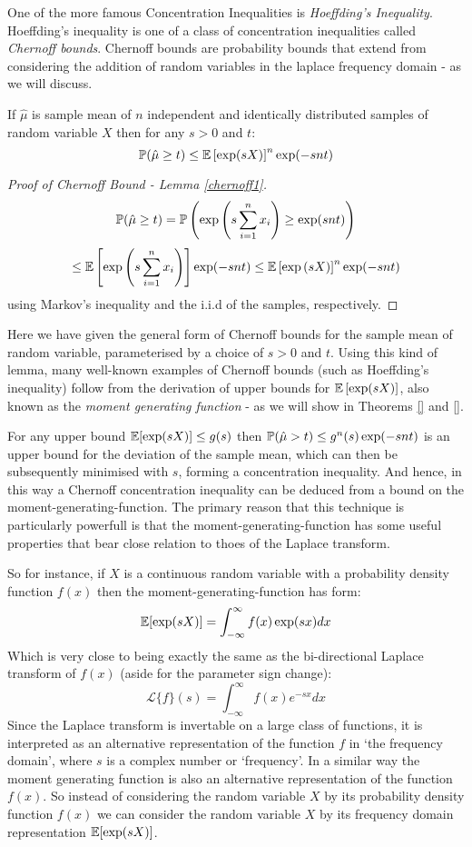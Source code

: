 One of the more famous Concentration Inequalities is \textit{Hoeffding's Inequality}.
Hoeffding's inequality is one of a class of concentration inequalities called \textit{Chernoff bounds}.
Chernoff bounds are probability bounds that extend from considering the addition of random variables in the laplace frequency domain - as we will discuss.

\begin{lemma}\label{chernoff1}
If $\hat{\mu}$ is sample mean of $n$ independent and identically distributed samples of random variable $X$ then for any $s>0$ and $t$:
\[ \operatorname{\mathbb{P}}(\hat{\mu}\ge t)\le\operatorname{\mathbb{E}}\left[\exp(sX)\right]^n\exp(-snt) \]
\end{lemma}
\begin{proof}[Proof of Chernoff Bound - Lemma \ref{chernoff1}]
$$\operatorname{\mathbb{P}}(\hat{\mu}\ge t) =  \operatorname{\mathbb{P}}\left(\exp\left(s\sum_{i=1}^nx_i\right)\ge \exp(snt)\right)$$
$$\le \operatorname{\mathbb{E}}\left[\exp\left(s\sum_{i=1}^nx_i\right)\right]\exp(-snt) \le \operatorname{\mathbb{E}}\left[\exp\left(sX\right)\right]^n\exp(-snt)
$$
using Markov's inequality and the i.i.d of the samples, respectively.
\end{proof}

Here we have given the general form of Chernoff bounds for the sample mean of random variable, parameterised by a choice of $s>0$ and $t$.
Using this kind of lemma, many well-known examples of Chernoff bounds (such as Hoeffding's inequality) follow from the derivation of upper bounds for $\operatorname{\mathbb{E}}\left[\exp(sX)\right]$, also known as the \textit{moment generating function} - as we will show in Theorems \ref{} and \ref{}.

For any upper bound $\operatorname{\mathbb{E}}[\exp(sX)]\le g(s)$ then $\operatorname{\mathbb{P}}(\hat{\mu}>t)\le g^n(s)\exp(-snt)$ is an upper bound for the deviation of the sample mean, which can then be subsequently minimised with $s$, forming a concentration inequality.
And hence, in this way a Chernoff concentration inequality can be deduced from a bound on the moment-generating-function.
The primary reason that this technique is particularly powerfull is that the moment-generating-function has some useful properties that bear close relation to thoes of the Laplace transform.

So for instance, if $X$ is a continuous random variable with a probability density function $f(x)$ then the moment-generating-function has form:
$$ \operatorname{\mathbb{E}}[\exp(sX)] = \int_{-\infty}^\infty f(x)\exp(sx) dx $$
Which is very close to being exactly the same as the bi-directional Laplace transform of $f(x)$ (aside for the parameter sign change):
$$ \mathcal{L}\{f\}(s) = \int_{-\infty}^\infty f(x)e^{-sx} dx$$
Since the Laplace transform is invertable on a large class of functions, it is interpreted as an alternative representation of the function $f$ in `the frequency domain', where $s$ is a complex number or `frequency'.
In a similar way the moment generating function is also an alternative representation of the function $f(x)$.
So instead of considering the random variable $X$ by its probability density function $f(x)$ we can consider the random variable $X$ by its frequency domain representation $\operatorname{\mathbb{E}}[\exp(sX)]$.

